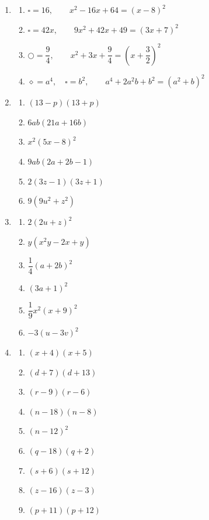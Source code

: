\begin{enumerate}
    \item
          \begin{enumerate}
              \item \(\square=16,\qquad x^2-16x+64=(x-8)^2\)
              \item \(\square=42x,\qquad 9x^2+42x+49=(3x+7)^2\)
              \item \(\bigcirc=\dfrac94,\qquad x^2+3x+\dfrac94=\left(x+\dfrac32\right)^2\)
              \item \(\diamond=a^4,\quad \square=b^2,\qquad
                    a^4+2a^2b+b^2=(a^2+b)^2\)
          \end{enumerate}

    \item
          \begin{enumerate}
              \item \((13-p)(13+p)\)
              \item \(6ab(21a+16b)\)
              \item \(x^2(5x-8)^2\)
              \item \(9ab(2a+2b-1)\)
              \item \(2(3z-1)(3z+1)\)
              \item \(9(9u^2+z^2)\)
          \end{enumerate}

    \item
          \begin{enumerate}
              \item \(2(2u+z)^2\)
              \item \(y(x^2y-2x+y)\)
              \item \(\dfrac14(a+2b)^2\)
              \item \((3a+1)^2\)
              \item \(\dfrac19x^2(x+9)^2\)
              \item \(-3(u-3v)^2\)
          \end{enumerate}

    \item
          \begin{enumerate}
              \item \((x+4)(x+5)\)
              \item \((d+7)(d+13)\)
              \item \((r-9)(r-6)\)
              \item \((n-18)(n-8)\)
              \item \((n-12)^2\)
              \item \((q-18)(q+2)\)
              \item \((s+6)(s+12)\)
              \item \((z-16)(z-3)\)
              \item \((p+11)(p+12)\)
          \end{enumerate}


\end{enumerate}
